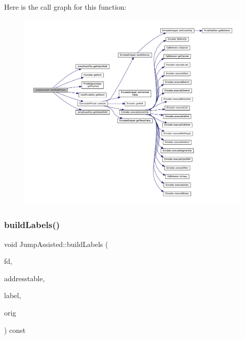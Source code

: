 Here is the call graph for this function\+:
\nopagebreak
\begin{figure}[H]
\begin{center}
\leavevmode
\includegraphics[width=350pt]{class_jump_assisted_aff52f4a983f867d9bd105a6856e473a5_cgraph}
\end{center}
\end{figure}
\mbox{\label{class_jump_assisted_aa8d0c353dd73697469c552b04146efe6}} 
\subsubsection{\texorpdfstring{buildLabels()}{buildLabels()}}
{\footnotesize\ttfamily void Jump\+Assisted\+::build\+Labels (\begin{DoxyParamCaption}\item[{\mbox{\hyperlink{class_funcdata}{Funcdata}} $\ast$}]{fd,  }\item[{vector$<$ \mbox{\hyperlink{class_address}{Address}} $>$ \&}]{addresstable,  }\item[{vector$<$ \mbox{\hyperlink{types_8h_a2db313c5d32a12b01d26ac9b3bca178f}{uintb}} $>$ \&}]{label,  }\item[{const \mbox{\hyperlink{class_jump_model}{Jump\+Model}} $\ast$}]{orig }\end{DoxyParamCaption}) const\hspace{0.3cm}{\ttfamily [virtual]}}



